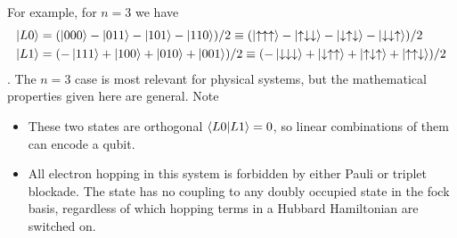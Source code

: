 \documentclass{report}
\begin{document}
\begin{appendices}
For example, for $n = 3$ we have
\begin{align*}
    \ket{L0} &= (\ket{000} - \ket{011} - \ket{101} - \ket{110})/2 \equiv (\ket{\uparrow\uparrow\uparrow} - \ket{\uparrow\downarrow\downarrow} - \ket{\downarrow\uparrow\downarrow} - \ket{\downarrow\downarrow\uparrow})/2\\
    \ket{L1} &= (-\ket{111} + \ket{100} + \ket{010} + \ket{001})/2 \equiv (-\ket{\downarrow\downarrow\downarrow} + \ket{\downarrow\uparrow\uparrow} + \ket{\uparrow\downarrow\uparrow} + \ket{\uparrow\uparrow\downarrow})/2
\end{align*}. The $n=3$ case is most relevant for physical systems, but the mathematical properties given here are general. Note
\begin{itemize}
    \item These two states are orthogonal $\braket{L0|L1} = 0$, so linear combinations of them can encode a qubit.
    \item All electron hopping in this system is forbidden by either Pauli or triplet blockade. The state has no coupling to any doubly occupied state in the fock basis, regardless of which hopping terms in a Hubbard Hamiltonian are switched on.
\end{itemize}


\end{appendices}
\end{document}
